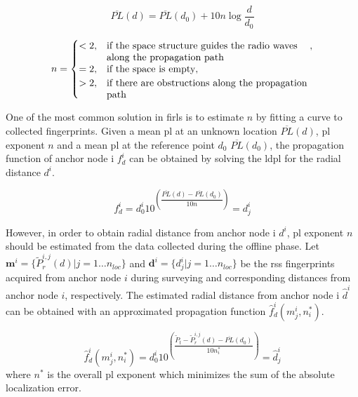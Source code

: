     \begin{equation}
        \label{eq:log-distance}
        \overline{PL}(d) = \overline{PL}(d_0) + 10 n \log{\dfrac{d}{d_0}}
    \end{equation}

    \begin{equation}
        n =
        \begin{cases}
            <2,& \parbox[t]{.6\textwidth}{if the space structure guides the radio waves\\
                                        along the propagation path}, \\
            =2,& \text{if the space is empty}, \\
            >2,& \parbox[t]{.6\textwidth}{if there are obstructions along the propagation\\
                                        path}
        \end{cases}
    \end{equation}

    One of the most common solution in \gls{firl}s is to estimate $n$ by fitting a curve to collected fingerprints.
    Given a mean \gls{pl} at an unknown location $\overline{PL}(d)$, \gls{pl} exponent $n$ and a mean \gls{pl} at the reference point $d_0$ $\overline{PL}(d_0)$, the propagation function of anchor node i $f^i_{d}$ can be obtained by solving the \gls{ldpl} for the radial distance $d^i$.

    \begin{equation}
      \label{eq:log-distance-d}
      f^i_{d} = d^i_0 10^{\left(\dfrac{\overline{PL}(d)-\overline{PL}(d_0)}{10 n} \right)} = d^i_j
    \end{equation}


    However, in order to obtain radial distance from anchor node i $d^i$, \gls{pl} exponent $n$ should be estimated from the data collected during the offline phase.
    Let $\bm{m}^i = \{\widetilde{P}_r^{i,j}(d) | j=1 \ldots n_{loc} \}$ and $\bm{d}^i = \{ d^i_j | j = 1 \ldots n_{loc}\}$ be the \gls{rss} fingerprints acquired from anchor node $i$ during surveying and corresponding distances from anchor node $i$, respectively.
    The estimated radial distance from anchor node i $\hat{d}^i$ can be obtained with an approximated propagation function $\hat{f}^i_d(m^i_j, n_i^*)$.

    \begin{equation}
      \label{eq:log-distance-d-app}
      \hat{f}^i_d(m^i_j, n_i^*) = d^i_0 10^{\left(\dfrac{\widetilde{P}_t - \widetilde{P}_r^{i,j}(d) - \overline{PL}(d_0)}{10 n_i^*} \right)} = \hat{d}^i_j
    \end{equation}
    where $n^*$ is the overall \gls{pl} exponent which minimizes the sum of the absolute localization error.

